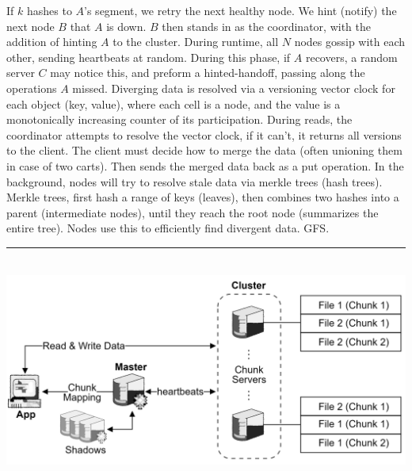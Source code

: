 \begin{multicols}{2}
If $k$ hashes to $A$'s segment, we retry the next healthy node. We hint (notify) the next node $B$ that $A$ is down. $B$ then stands in as 
the coordinator, with the addition of hinting $A$ to the cluster. During runtime, all $N$ nodes gossip with each other, sending heartbeats at random. During this phase,
if $A$ recovers, a random server $C$ may notice this, and preform a hinted-handoff, passing along the operations $A$ missed. Diverging data is 
resolved via a versioning vector clock for each object (key, value), where each cell is a node, and the value is a monotonically increasing counter of its participation.
During reads, the coordinator attempts to resolve the vector clock, if it can't, it returns all versions to the client. The client must decide how to merge the data (often unioning them in case of two carts).
Then sends the merged data back as a put operation. In the background, nodes will try to resolve stale data via merkle trees (hash trees). Merkle trees, first hash a range of keys (leaves), then combines two 
hashes into a parent (intermediate nodes), until they reach the root node (summarizes the entire tree). Nodes use this to efficiently find divergent data.
GFS.

\noindent
\rule{\linewidth}{0.4pt}\\

\hspace{-1.5em}
\includegraphics[width=\linewidth]{Sections/gfs/high.png}\\


\end{multicols}


